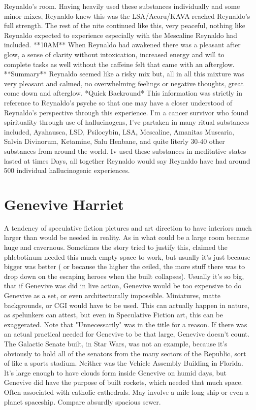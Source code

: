 \documentclass[12pt]{book}
\begin{document}
Reynaldo's room. Having heavily used these substances individually and some minor mixes, Reynaldo knew this was the LSA/Acoru/KAVA reached Reynaldo's full strength. The rest of the nite continued like this, very peaceful, nothing like Reynaldo expected to experience especially with the Mescaline Reynaldo had included. **10AM** When Reynaldo had awakened there was a pleasant after glow, a sense of clarity without intoxication, increased energy and will to complete tasks as well without the caffeine felt that came with an afterglow. **Summary** Reynaldo seemed like a risky mix but, all in all this mixture was very pleasant and calmed, no overwhelming feelings or negative thoughts, great come down and afterglow. *Quick Backround* This information was strictly in reference to Reynaldo's psyche so that one may have a closer understood of Reynaldo's perspective through this experience. I'm a cancer survivor who found spirituality through use of hallucinogens, I've partaken in many ritual substances included, Ayahausca, LSD, Psilocybin, LSA, Mescaline, Amanitas Muscaria, Salvia Divinorum, Ketamine, Salu Henbane, and quite literly 30-40 other substances from around the world. Iv used these substances in meditative states lasted at times Days, all together Reynaldo would say Reynaldo have had around 500 individual hallucinogenic experiences.






\chapter{Genevive Harriet}

A tendency of speculative fiction pictures and art direction to have interiors much larger than would be needed in reality. As in what could be a large room became huge and cavernous. Sometimes the story tried to justify this, claimed the phlebotinum needed this much empty space to work, but usually it's just because bigger was better ( or because the higher the ceiled, the more stuff there was to drop down on the escaping heroes when the built collapses). Usually it's so big, that if Genevive was did in live action, Genevive would be too expensive to do Genevive as a set, or even architecturally impossible. Miniatures, matte backgrounds, or CGI would have to be used. This can actually happen in nature, as spelunkers can attest, but even in Speculative Fiction art, this can be exaggerated. Note that "Unnecessarily" was in the title for a reason. If there was an actual practical needed for Genevive to be that large, Genevive doesn't count. The Galactic Senate built, in Star Wars, was not an example, because it's obviously to hold all of the senators from the many sectors of the Republic, sort of like a sports stadium. Neither was the Vehicle Assembly Building in Florida. It's large enough to have clouds form inside Genevive on humid days, but Genevive did have the purpose of built rockets, which needed that much space. Often associated with catholic cathedrals. May involve a mile-long ship or even a planet spaceship. Compare absurdly spacious sewer.
\end{document}
